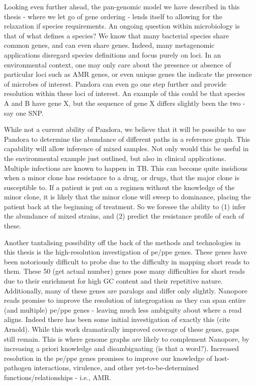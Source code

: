 Looking even further ahead, the pan-genomic model we have described in this thesis - where we let go of gene ordering - lends itself to allowing for the relaxation if species requirements. An ongoing question within microbiology is that of what defines a species? We know that many bacterial species share common genes, and can even share genes. Indeed, many metagenomic applications disregard species definitions and focus purely on loci. In an environmental context, one may only care about the presence or absence of particular loci such as AMR genes, or even unique genes the indicate the presence of microbes of interest. Pandora can even go one step further and provide resolution within these loci of interest. An example of this could be that species A and B have gene X, but the sequence of gene X differs slightly been the two - say one SNP. 


While not a current ability of Pandora, we believe that it will be possible to use Pandora to determine the abundance of different paths in a reference graph. This capability will allow inference of mixed samples. Not only would this be useful in the environmental example just outlined, but also in clinical applications. Multiple infections are known to happen in TB. This can become quite insidious when a minor clone has resistance to a drug, or drugs, that the major clone is susceptible to. If a patient is put on a regimen without the knowledge of the minor clone, it is likely that the minor clone will sweep to dominance, placing the patient back at the beginning of treatment. So we foresee the ability to (1) infer the abundance of mixed strains, and (2) predict the resistance profile of each of these.


Another tantalising possibility off the back of the methods and technologies in this thesis is the high-resolution investigation of pe/ppe genes. These genes have been notoriously difficult to probe due to the difficulty in mapping short reads to them. These 50 (get actual number) genes pose many difficulties for short reads due to their enrichment for high GC content and their repetitive nature. Additionally, many of these genes are paralogs and differ only slightly. Nanopore reads promise to improve the resolution of integrogation as they can span entire (and multiple) pe/ppe genes - leaving much less ambiguity about where a read aligns. Indeed there has been some initial investigation of exactly this (cite Arnold). While this work dramatically improved coverage of these genes, gaps still remain. This is where genome graphs are likely to complement Nanopore, by increasing a priori knowledge and disambiguating (is that a word?).  
Increased resolution in the pe/ppe genes promises to improve our knowledge of host-pathogen interactions, virulence, and other yet-to-be-determined functions/relationships - i.e., AMR.

